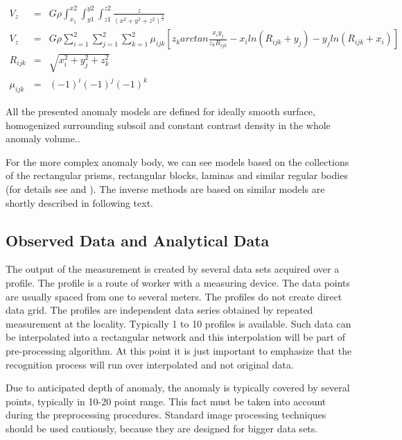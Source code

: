 \documentclass[FM]{tulthesis}
\begin{document}
\begin{eqnarray} \label{eq:PotentialPrism}
V_{z} & = & G\rho \int_{x_{1}}^{x{2}} \int_{y1}^{y2} \int_{z1}^{z2} \frac{z}{(x^{2} + y^{2} + z^{2})^{\frac{3}{2}}}\\[2em]
V_{z} & = & G\rho \sum_{i=1}^{2} \sum_{j=1}^{2} \sum_{k=1}^{2} \mu_{ijk} \left[ z_{k}arctan\frac{x_{i}y_{j}}{z_{k}R_{ijk}} - x_{i}ln(R_{ijk} + y_{j}) - y_{j}ln(R_{ijk} + x_{i}) \right] \nonumber \\[2em]
R_{ijk} & = & \sqrt{x_{i}^{2} + y_{j}^{2} + z_{k}^{2}} \nonumber \\[2em]
\mu_{ijk} & = & (-1)^{i}(-1)^{j}(-1)^{k} \nonumber
\end{eqnarray}

All the presented anomaly models are defined for ideally smooth surface, homogenized surrounding subsoil and constant contrast density in the whole anomaly volume.. 

For the more complex anomaly body, we can see models based on the collections of the rectangular prisms, rectangular blocks, laminas and similar regular bodies (for details see \cite{Mares} and \cite{Blakely}). The inverse methods are based on similar models are shortly described in following text.

\subsection{Observed Data and Analytical Data} \label{sec:GraviData}

The output of the measurement is created by several data sets acquired over a profile. The profile is a route of worker with a measuring device. The data points are usually spaced from one to several meters. The profiles do not create direct data grid. The profiles are independent data series obtained by repeated measurement at the locality. Typically 1 to 10 profiles is available. Such data can be interpolated into a rectangular network and this interpolation will be part of pre-processing algorithm. At this point it is just important to emphasize that the recognition process will run over interpolated and not original data.%

Due to anticipated depth of anomaly, the anomaly is typically covered by several points, typically in 10-20 point range. This fact must be taken into account during the preprocessing procedures. Standard image processing techniques should be used cautiously, because they are designed for bigger data sets.
\end{document}
